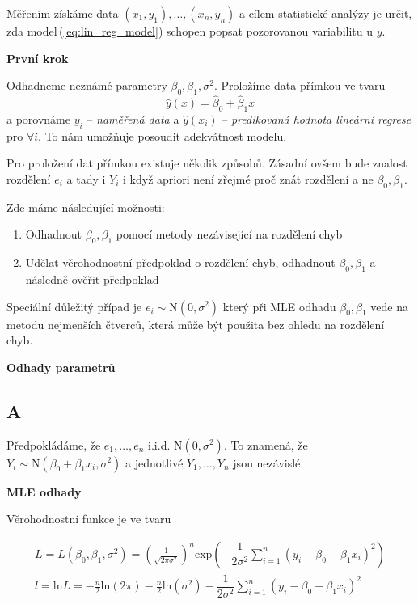Měřením získáme data $ (x_{1}, y_{1}), \dots ,( x_{n}, y_{n} )$ a cílem statistické analýzy je určit, zda model\,(\eqref{eq:lin_reg_model}) schopen popsat pozorovanou variabilitu u $ y $. 

\textbf{První krok }

Odhadneme neznámé parametry $ \beta_{0}, \beta_{1}, \sigma^{2} $. Proložíme data přímkou ve tvaru
\begin{equation}\label{eq:lin_reg_model}
	\widehat{y}(x) = \widehat{\beta}_{0} + \widehat{\beta}_{1} x 
\end{equation}
a porovnáme $ y_{i} $ -- \textit{naměřená data} a $ \widehat{y}(x_{i}) $ -- \textit{predikovaná hodnota lineární regrese} pro $ \forall i $. To nám umožňuje posoudit adekvátnost modelu.

Pro proložení dat přímkou existuje několik způsobů. Zásadní ovšem bude znalost rozdělení $ e_{i} $ a tady i $ Y_{i} $ i když apriori není zřejmé proč znát rozdělení a ne $ \beta_{0}, \beta_{1} $.

Zde máme následující možnosti:

\begin{enumerate}
  \item Odhadnout $ \beta_{0} , \beta_{1} $ pomocí metody nezávisející na rozdělení chyb
  \item Udělat věrohodnostní předpoklad o rozdělení chyb, odhadnout $ \beta_{0} , \beta_{1} $ a následně ověřit předpoklad
\end{enumerate}


\begin{remark}
 Speciální důležitý případ je $ e_{i} \sim \text{N}(0,\sigma^{2}) $ který při MLE odhadu $ \beta_{0}, \beta_{1} $ vede na metodu nejmenších čtverců, která může být použita bez ohledu na rozdělení chyb.
\end{remark}

\textbf{Odhady parametrů}
\subsection{A}
Předpokládáme, že $ e_{1}, \dots , e_{n} $ i.i.d. $ \text{N}(0,\sigma^{2}) $. To znamená, že $ Y_{i} \sim \text{N}(\beta_{0} + \beta_{1} x_{i},\sigma^{2}) $ a jednotlivé $ Y_{1}, \dots , Y_{n} $ jsou nezávislé.

\textbf{MLE odhady}

Věrohodnostní funkce je ve tvaru

\begin{equation}
\begin{aligned}
	L = L ( \beta_{0} , \beta_{1} , \sigma^{2} ) = \left( \frac{1}{ \sqrt{ 2 \pi \sigma^{2} }} \right) ^{n} \text{exp} \left( - \dfrac{1}{2 \sigma^{2} } \sum_{i = 1}^{n}( y_{i} -  \beta_{0}  - \beta_{1} x_{i} )^{2} \right) \\
l = \text{ln} L = -\frac{n}{2} \text{ln} ( 2 \pi ) -\frac{n}{2} \text{ln} (\sigma^{2} ) - \dfrac{1}{2 \sigma^{2} } \sum_{i = 1}^{n}( y_{i} -  \beta_{0}  - \beta_{1} x_{i})^{2}
\end{aligned}
\end{equation}

